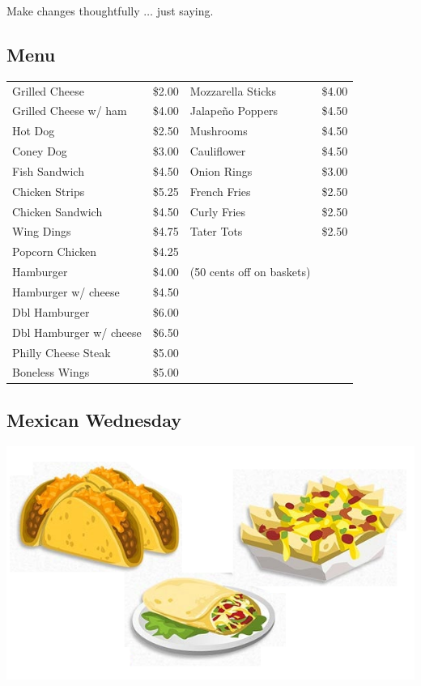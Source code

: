 \documentclass[a0,landscape]{a0poster}
\begin{document}
\begin{multicols}{4}
\begin{flushright}
Make changes thoughtfully $\hdots$ just saying.
\end{flushright}

\subsection*{Menu}
\begin{center}
\begin{tabular}{ l r l r}
Grilled Cheese & \$2.00 & Mozzarella Sticks & \$4.00 \\
Grilled Cheese w/ ham & \$4.00 & Jalapeño Poppers & \$4.50 \\
Hot Dog & \$2.50 & Mushrooms & \$4.50 \\
Coney Dog & \$3.00 & Cauliflower & \$4.50 \\
Fish Sandwich & \$4.50 & Onion Rings & \$3.00 \\
Chicken Strips & \$5.25 & French Fries & \$2.50 \\
Chicken Sandwich & \$4.50 & Curly Fries & \$2.50 \\
Wing Dings & \$4.75 & Tater Tots & \$2.50 \\
Popcorn Chicken & \$4.25 & &\\
Hamburger & \$4.00 & (50 cents off on baskets) & \\
Hamburger w/ cheese & \$4.50 & & \\
Dbl Hamburger & \$6.00 & & \\
Dbl Hamburger w/ cheese & \$6.50 & & \\
Philly Cheese Steak & \$5.00 & & \\
Boneless Wings & \$5.00 & & \\
\end{tabular}
\end{center}

\subsection*{Mexican Wednesday}

\begin{center}
\includegraphics[width=0.8\linewidth]{images/mexican1}
\end{center}


\end{multicols}
\end{document}
